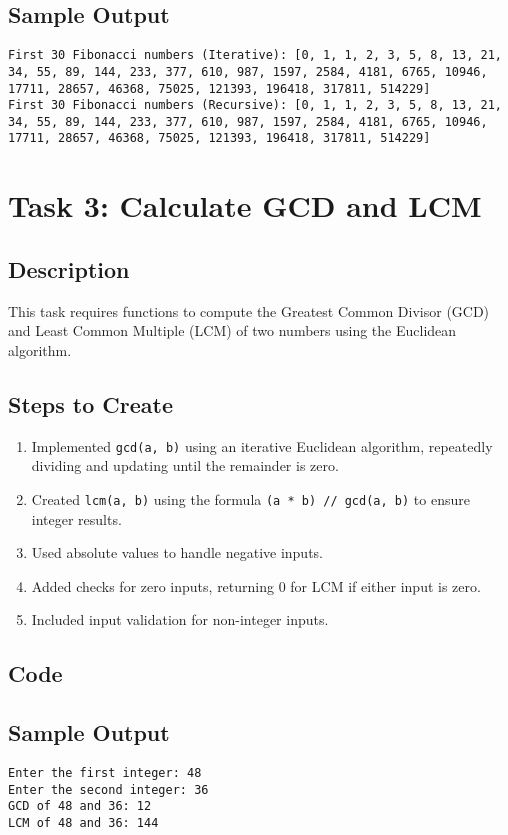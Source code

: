 \documentclass[a4paper,12pt]{article}
\begin{document}
\subsection{Sample Output}
\begin{verbatim}
First 30 Fibonacci numbers (Iterative): [0, 1, 1, 2, 3, 5, 8, 13, 21, 34, 55, 89, 144, 233, 377, 610, 987, 1597, 2584, 4181, 6765, 10946, 17711, 28657, 46368, 75025, 121393, 196418, 317811, 514229]
First 30 Fibonacci numbers (Recursive): [0, 1, 1, 2, 3, 5, 8, 13, 21, 34, 55, 89, 144, 233, 377, 610, 987, 1597, 2584, 4181, 6765, 10946, 17711, 28657, 46368, 75025, 121393, 196418, 317811, 514229]
\end{verbatim}

\section{Task 3: Calculate GCD and LCM}
\subsection{Description}
This task requires functions to compute the Greatest Common Divisor (GCD) and Least Common Multiple (LCM) of two numbers using the Euclidean algorithm.

\subsection{Steps to Create}
\begin{enumerate}
    \item Implemented \texttt{gcd(a, b)} using an iterative Euclidean algorithm, repeatedly dividing and updating until the remainder is zero.
    \item Created \texttt{lcm(a, b)} using the formula \texttt{(a * b) // gcd(a, b)} to ensure integer results.
    \item Used absolute values to handle negative inputs.
    \item Added checks for zero inputs, returning 0 for LCM if either input is zero.
    \item Included input validation for non-integer inputs.
\end{enumerate}

\subsection{Code}


\subsection{Sample Output}
\begin{verbatim}
Enter the first integer: 48
Enter the second integer: 36
GCD of 48 and 36: 12
LCM of 48 and 36: 144
\end{verbatim}
\end{document}
